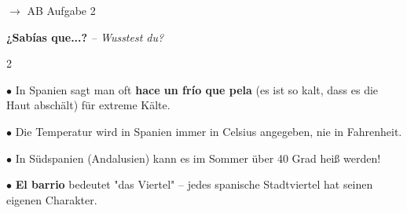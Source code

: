 \documentclass[11pt, a4paper]{article}
\newcommand{\seriftext}[1]{{\fontfamily{ppl}\selectfont #1}}
\newcommand{\es}[1]{\seriftext{\textbf{#1}}}
\newcommand{\de}[1]{\textit{\textcolor{akzent}{#1}}}
\newcommand{\abmark}[1]{{\footnotesize\textcolor{akzent}{$\rightarrow$ AB #1}}}
\begin{document}
\abmark{Aufgabe 2}

\vspace{8pt}


\begin{grammatikbox}
\textbf{¿Sabías que...?} \de{-- Wusstest du?}

\vspace{4pt}
\begin{multicols}{2}
\footnotesize

$\bullet$ In Spanien sagt man oft \es{hace un frío que pela} (es ist so kalt, dass es die Haut abschält) für extreme Kälte.

\vspace{3pt}
$\bullet$ Die Temperatur wird in Spanien immer in Celsius angegeben, nie in Fahrenheit.

\columnbreak

$\bullet$ In Südspanien (Andalusien) kann es im Sommer über 40 Grad heiß werden!

\vspace{3pt}
$\bullet$ \es{El barrio} bedeutet "das Viertel" -- jedes spanische Stadtviertel hat seinen eigenen Charakter.

\end{multicols}
\end{grammatikbox}
\end{document}
